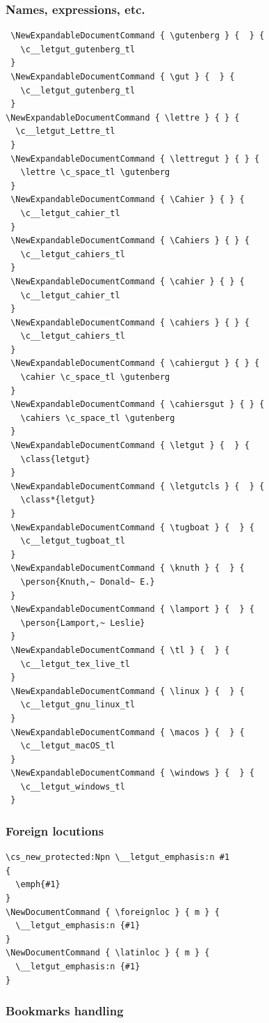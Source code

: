 \documentclass{letgut}
\begin{document}
\subsubsection{Names, expressions, etc.}
\label{sec:org45141b1}

\begin{lstlisting}
 \NewExpandableDocumentCommand { \gutenberg } {  } {
   \c__letgut_gutenberg_tl
 }
 \NewExpandableDocumentCommand { \gut } {  } {
   \c__letgut_gutenberg_tl
 }
\NewExpandableDocumentCommand { \lettre } { } {
  \c__letgut_Lettre_tl
 }
 \NewExpandableDocumentCommand { \lettregut } { } {
   \lettre \c_space_tl \gutenberg
 }
 \NewExpandableDocumentCommand { \Cahier } { } {
   \c__letgut_cahier_tl
 }
 \NewExpandableDocumentCommand { \Cahiers } { } {
   \c__letgut_cahiers_tl
 }
 \NewExpandableDocumentCommand { \cahier } { } {
   \c__letgut_cahier_tl
 }
 \NewExpandableDocumentCommand { \cahiers } { } {
   \c__letgut_cahiers_tl
 }
 \NewExpandableDocumentCommand { \cahiergut } { } {
   \cahier \c_space_tl \gutenberg
 }
 \NewExpandableDocumentCommand { \cahiersgut } { } {
   \cahiers \c_space_tl \gutenberg
 }
 \NewExpandableDocumentCommand { \letgut } {  } {
   \class{letgut}
 }
 \NewExpandableDocumentCommand { \letgutcls } {  } {
   \class*{letgut}
 }
 \NewExpandableDocumentCommand { \tugboat } {  } {
   \c__letgut_tugboat_tl
 }
 \NewExpandableDocumentCommand { \knuth } {  } {
   \person{Knuth,~ Donald~ E.}
 }
 \NewExpandableDocumentCommand { \lamport } {  } {
   \person{Lamport,~ Leslie}
 }
 \NewExpandableDocumentCommand { \tl } {  } {
   \c__letgut_tex_live_tl
 }
 \NewExpandableDocumentCommand { \linux } {  } {
   \c__letgut_gnu_linux_tl
 }
 \NewExpandableDocumentCommand { \macos } {  } {
   \c__letgut_macOS_tl
 }
 \NewExpandableDocumentCommand { \windows } {  } {
   \c__letgut_windows_tl
 }
\end{lstlisting}

\subsubsection{Foreign locutions}
\label{sec:org32f4b23}

\begin{lstlisting}
\cs_new_protected:Npn \__letgut_emphasis:n #1
{
  \emph{#1}
}
\NewDocumentCommand { \foreignloc } { m } {
  \__letgut_emphasis:n {#1}
}
\NewDocumentCommand { \latinloc } { m } {
  \__letgut_emphasis:n {#1}
}
\end{lstlisting}

\subsubsection{Bookmarks handling}
\label{sec:org2ee5370}
\end{document}
